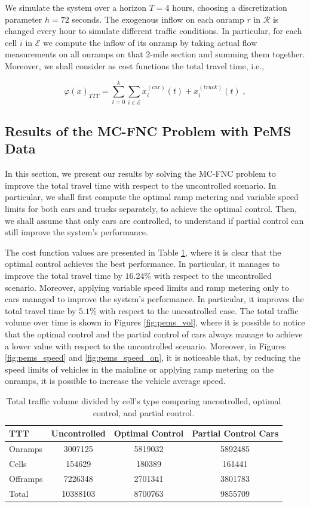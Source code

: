 \documentclass[preprint,12pt]{elsarticle}
\newcommand{\mc}{\mathcal}
\begin{document}
We simulate the system over a horizon $T = 4$ hours, choosing a discretization parameter $h = 72$ seconds. The exogenous inflow on each onramp $r$ in $\mc{R}$ is changed every hour to simulate different traffic conditions. In particular, for each cell $i$ in $\mc{E}$ we compute the inflow of its onramp by taking actual flow measurements on all onramps on that 2-mile section and summing them together. Moreover, we shall consider as cost functions the total travel time, i.e.,

 $$\varphi(x)_{TTT} =\sum\limits_{t=0}^{k}{} \sum\limits_{i \in \mc{E}} {} x_i^{(car)}(t) + x_i^{(truck)}(t) \;, $$

\subsection{Results of the MC-FNC Problem with PeMS Data}
In this section, we present our results by solving the MC-FNC problem to improve the total travel time with respect to the uncontrolled scenario. In particular, we shall first compute the optimal ramp metering and variable speed limits for both cars and trucks separately, to achieve the optimal control. Then, we shall assume that only cars are controlled, to understand if partial control can still improve the system's performance.

The cost function values are presented in Table \ref{tab:total_traffic_volume_optimal}, where it is clear that the optimal control achieves the best performance. In particular, it manages to improve the total travel time by $16.24\%$ with respect to the uncontrolled scenario. Moreover, applying variable speed limits and ramp metering only to cars managed to improve the system's performance. In particular, it improves the total travel time by $5.1\%$ with respect to the uncontrolled case. The total traffic volume over time is shown in Figures \ref{fig:pems_vol}, where it is possible to notice that the optimal control and the partial control of cars always manage to achieve a lower value with respect to the uncontrolled scenario. Moreover, in Figures \ref{fig:pems_speed} and \ref{fig:pems_speed_on}, it is noticeable that, by reducing the speed limits of vehicles in the mainline or applying ramp metering on the onramps, it is possible to increase the vehicle average speed.

\begin{table}
\centering
\begin{tabular}{lccc}
TTT  & Uncontrolled & Optimal Control & Partial Control Cars \\ \hline
Onramps   & 3007125   & 5819032 & 5892485\\ 
Cells   & 154629   & 180389 & 161441\\ 
Offramps & 7226348 &  2701341 & 3801783\\ \hline
Total & 10388103 & 8700763 & 9855709\\ \hline
\end{tabular}
\label{tab:total_traffic_volume_optimal}
\caption{Total traffic volume divided by cell's type comparing uncontrolled, optimal control, and partial control.}
\end{table}
\end{document}
